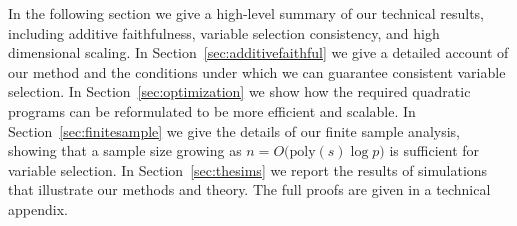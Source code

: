 %
%

In the following section we give a high-level summary of our technical
results, including additive faithfulness, variable selection 
consistency, and high dimensional scaling.  In
Section~\ref{sec:additivefaithful} we give a detailed account
of our method and the conditions under which we can guarantee
consistent variable selection.  In Section~\ref{sec:optimization}
we show how the required quadratic programs can be reformulated
to be more efficient and scalable.  In Section~\ref{sec:finitesample}
we give the details of our finite sample analysis, showing
that a sample size growing as $n = O\big(\textrm{poly}(s) \log p\big)$
is sufficient for variable selection.  In Section~\ref{sec:thesims}
we report the results of simulations that illustrate our methods
and theory.  The full proofs are
given in a technical appendix.





